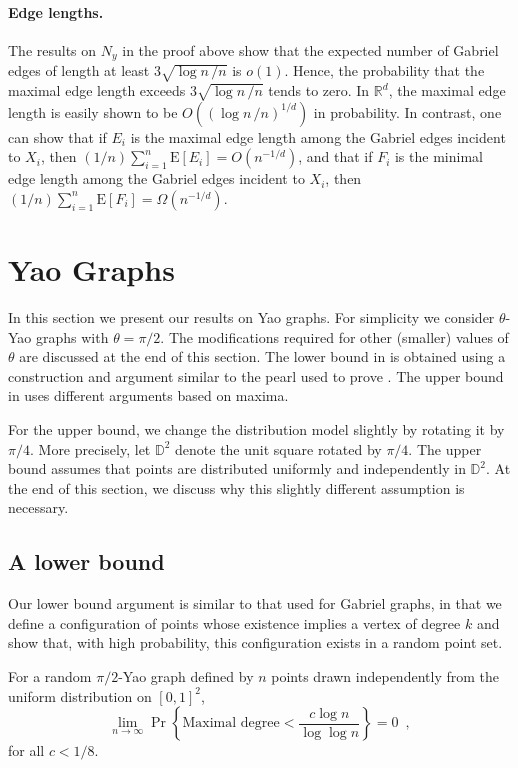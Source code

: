 \documentclass[lotsofwhite,charterfonts]{patmorin}
\newcommand{\RR}{\mathbb{R}}
\newcommand{\D}{\mathbb{D}}
\newcommand{\EXP}{\mathrm{E}}
\begin{document}
\paragraph{Edge lengths.}
The results on $N_y$ in the proof above
show that the expected number of Gabriel
edges of length at least $3 \sqrt{\log n \,/n}$
is $o(1)$. Hence, the probability that the maximal edge
length exceeds $3 \sqrt{\log n \,/n}$ tends to zero.
In $\RR^d$, the maximal edge length is
easily shown to be $O((\log n \,/n)^{1/d})$ in
probability.
In contrast, one can show that if $E_i$ is the
maximal edge length among the Gabriel edges incident to $X_i$,
then $(1/n) \sum_{i=1}^n \EXP[E_i]= O(n^{-1/d})$,
and that if 
$F_i$ is the
minimal edge length among the Gabriel edges incident to $X_i$,
then $(1/n) \sum_{i=1}^n \EXP[F_i]= \Omega (n^{-1/d})$. 

\section{Yao Graphs}

In this section we present our results on Yao graphs.  For simplicity
we consider $\theta$-Yao graphs with $\theta=\pi/2$.  The modifications
required for other (smaller) values of $\theta$ are discussed at the end
of this section.  The lower bound in  is obtained
using a construction and argument similar to the pearl used to prove
.  The upper bound in 
uses different arguments based on maxima.

For the upper bound, we change the distribution model slightly by rotating
it by $\pi/4$.  More precisely, let $\D^2$ denote the unit square rotated
by $\pi/4$.  The upper bound assumes that points are distributed uniformly
and independently in $\D^2$. At the end of this section, we discuss why
this slightly different assumption is necessary.

\subsection{A lower bound}

Our lower bound argument is similar to that used for Gabriel graphs, in
that we define a configuration of points whose existence implies a vertex
of degree $k$ and show that, with high probability, this configuration
exists in a random point set.  

\begin{thm}
For a random $\pi/2$-Yao graph defined by $n$ points drawn independently
from the uniform distribution on $[0,1]^2$,
\[
   \lim_{n\rightarrow\infty}
     \Pr\left\{\mbox{Maximal degree} < \frac{c\log n}{\log\log n} \right\} 
       = 0 \enspace ,
\]
for all $c < 1/8$.
\end{thm}
\end{document}
